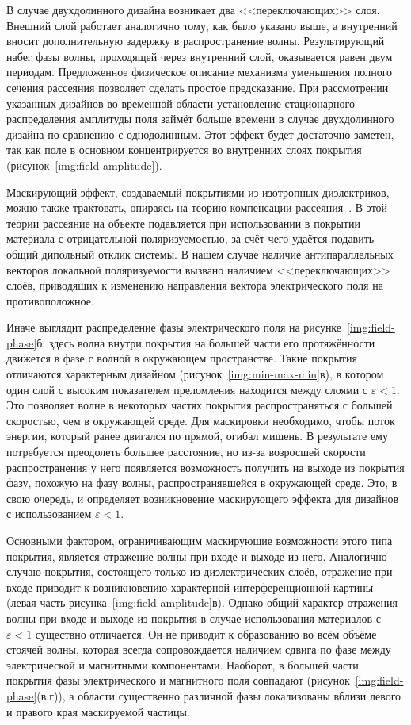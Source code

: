 В случае двухдолинного дизайна возникает два <<переключающих>> слоя.
Внешний слой работает аналогично тому, как было указано выше, а
внутренний вносит дополнительную задержку в распространение
волны. Результирующий набег фазы волны, проходящей через внутренний
слой, оказывается равен двум периодам.  Предложенное физическое
описание механизма уменьшения полного сечения рассеяния позволяет
сделать простое предсказание.  При рассмотрении указанных дизайнов во
временной области установление стационарного распределения амплитуды
поля займёт больше времени в случае
двухдолинного дизайна по сравнению с однодолинным. Этот эффект будет
достаточно заметен, так как поле в основном концентрируется во
внутренних слоях покрытия (рисунок~\ref{img:field-amplitude}).

Маскирующий эффект, создаваемый покрытиями из изотропных диэлектриков,
можно также трактовать, опираясь на теорию компенсации
рассеяния~\cite{Alu-2005, alu}.  В этой теории рассеяние на объекте
подавляется при использовании в покрытии материала с отрицательной
поляризуемостью, за счёт чего удаётся подавить общий дипольный отклик
системы. В нашем случае наличие антипараллельных векторов локальной
поляризуемости вызвано наличием <<переключающих>> слоёв, приводящих к
изменению направления вектора электрического поля на противоположное.

Иначе выглядит распределение фазы электрического поля на
рисунке~\ref{img:field-phase}б: здесь волна внутри покрытия на
большей части его протяжённости движется в фазе с волной в окружающем
пространстве.  Такие покрытия отличаются характерным дизайном
(рисунок~\ref{img:min-max-min}в), в котором один слой с высоким
показателем преломления находится между слоями с
${\varepsilon<1}$. Это позволяет волне в некоторых частях покрытия распространяться
с большей скоростью, чем в окружающей  среде. Для маскировки
необходимо, чтобы поток энергии, который ранее двигался по прямой,
огибал мишень. В результате ему потребуется преодолеть большее
расстояние, но из-за возросшей скорости распространения у него
появляется возможность получить на выходе из покрытия фазу, похожую на
фазу волны, распространявшейся в окружающей среде. Это, в свою
очередь, и определяет возникновение маскирующего эффекта для дизайнов
с использованием ${\varepsilon<1}$.

Основными фактором, ограничивающим маскирующие возможности этого типа
покрытия, является отражение волны при входе и выходе из него.
Аналогично случаю покрытия, состоящего только из диэлектрических
слоёв, отражение при входе приводит к возникновению характерной
интерференционной картины (левая часть
рисунка~\ref{img:field-amplitude}в). Однако общий характер отражения
волны при входе и выходе из покрытия в случае использования материалов
с ${\varepsilon<1}$ существно отличается. Он не приводит к образованию
во всём объёме стоячей волны, которая всегда сопровождается наличием
сдвига по фазе между электрической и магнитными
компонентами. Наоборот, в большей части покрытия фазы электрического и
магнитного поля совпадают (рисунок~\ref{img:field-phase}(в,г)), а
области существенно различной фазы локализованы вблизи левого и
правого края маскируемой частицы.

